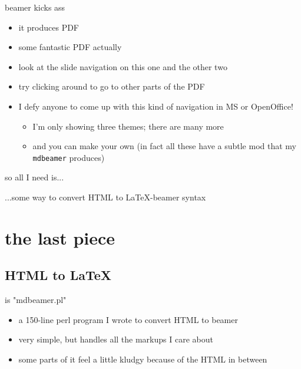 \documentclass{beamer}
\begin{document}
\begin{frame}{beamer kicks ass}

\begin{itemize}
\item
it produces PDF
\pause
\item
some fantastic PDF actually
\pause
\item
look at the slide navigation on this one and the other two
\pause
\item
try clicking around to go to other parts of the PDF
\pause
\item
I defy anyone to come up with this kind of navigation in MS or
OpenOffice!
\begin{itemize}
\item
I'm only showing three themes; there are many more
\item
and you can make your own (in fact all these have a subtle mod that my
\texttt{mdbeamer} produces)
\end{itemize}
\end{itemize}



\end{frame}

\begin{frame}{so all I need is...}

...some way to convert HTML to LaTeX-beamer syntax



\end{frame}

\section{the last piece}

\subsection{HTML to LaTeX}

\begin{frame}{is "mdbeamer.pl"}

\begin{itemize}
\item
a 150-line perl program I wrote to convert HTML to beamer
\item
very simple, but handles all the markups I care about
\item
some parts of it feel a little kludgy because of the HTML in between
\end{itemize}



\end{frame}
\end{document}

